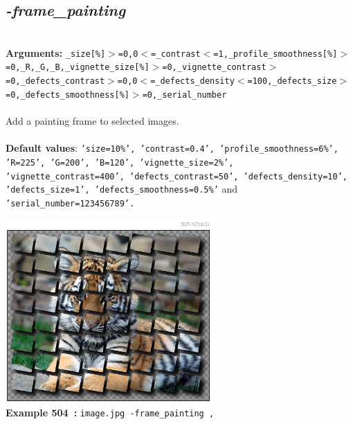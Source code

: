\documentclass[a4paper,11pt,twoside]{book}
\begin{document}
\subsection{\emph{-frame\_painting} }\vspace*{-0.5em}
~\\\textbf{Arguments: } 
{\small \texttt{\_size[\%]$>$=0,0$<$=\_contrast$<$=1,\_profile\_smoothness[\%]$>$=0,\_R,\_G,\_B,\_vignette\_size[\%]$>$=0,\_vignette\_contrast$>$=0,\_defects\_contrast$>$=0,0$<$=\_defects\_density$<$=100,\_defects\_size$>$=0,\_defects\_smoothness[\%]$>$=0,\_serial\_number}}\\~\\
Add a painting frame to selected images.
~\\~\\\textbf{Default values}: {\small \texttt{'size=10\%', 'contrast=0.4', 'profile\_smoothness=6\%', 'R=225', 'G=200', 'B=120', 'vignette\_size=2\%', 'vignette\_contrast=400', 'defects\_contrast=50', 'defects\_density=10', 'defects\_size=1', 'defects\_smoothness=0.5\%'} and \texttt{'serial\_number=123456789'.}}
\begin{center}\includegraphics[keepaspectratio=true,height=7cm,width=\textwidth]{img/gmic_def504.jpg}\\
{\footnotesize \textbf{Example 504~:} \texttt{image.jpg -frame\_painting ,}}
\end{center}
\end{document}
